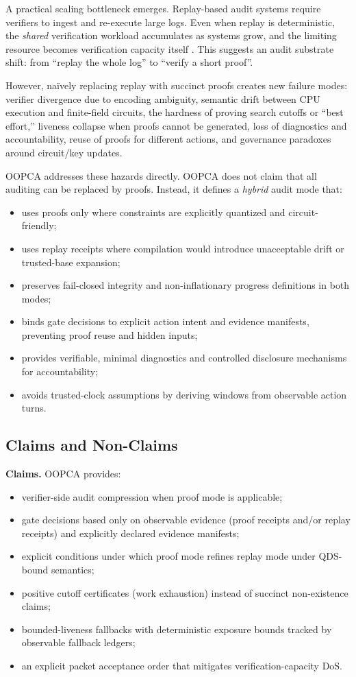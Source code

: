 \documentclass[11pt]{article}
\begin{document}
A practical scaling bottleneck emerges. Replay-based audit systems require verifiers to ingest and re-execute large logs. Even when replay is deterministic, the \emph{shared} verification workload accumulates as systems grow, and the limiting resource becomes verification capacity itself \cite{Takahashi2026VLIA}. This suggests an audit substrate shift: from ``replay the whole log'' to ``verify a short proof''.

However, naïvely replacing replay with succinct proofs creates new failure modes: verifier divergence due to encoding ambiguity, semantic drift between CPU execution and finite-field circuits, the hardness of proving search cutoffs or ``best effort,'' liveness collapse when proofs cannot be generated, loss of diagnostics and accountability, reuse of proofs for different actions, and governance paradoxes around circuit/key updates.

OOPCA addresses these hazards directly. OOPCA does not claim that all auditing can be replaced by proofs. Instead, it defines a \emph{hybrid} audit mode that:
\begin{itemize}[leftmargin=1.2em]
  \item uses proofs only where constraints are explicitly quantized and circuit-friendly;
  \item uses replay receipts where compilation would introduce unacceptable drift or trusted-base expansion;
  \item preserves fail-closed integrity and non-inflationary progress definitions in both modes;
  \item binds gate decisions to explicit action intent and evidence manifests, preventing proof reuse and hidden inputs;
  \item provides verifiable, minimal diagnostics and controlled disclosure mechanisms for accountability;
  \item avoids trusted-clock assumptions by deriving windows from observable action turns.
\end{itemize}

\subsection{Claims and Non-Claims}

\textbf{Claims.} OOPCA provides:
\begin{itemize}[leftmargin=1.2em]
  \item verifier-side audit compression when proof mode is applicable;
  \item gate decisions based only on observable evidence (proof receipts and/or replay receipts) and explicitly declared evidence manifests;
  \item explicit conditions under which proof mode refines replay mode under QDS-bound semantics;
  \item positive cutoff certificates (work exhaustion) instead of succinct non-existence claims;
  \item bounded-liveness fallbacks with deterministic exposure bounds tracked by observable fallback ledgers;
  \item an explicit packet acceptance order that mitigates verification-capacity DoS.
\end{itemize}
\end{document}

